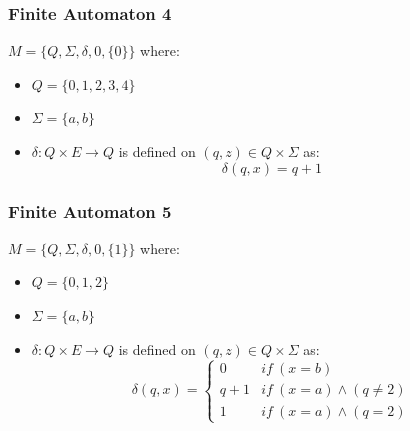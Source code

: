 \documentclass[letterpaper, 12pt]{math}
\begin{document}
\subsubsection*{Finite Automaton 4}
\( M = \{Q,\Sigma,\delta,0,\{0\}\} \) where:
\begin{itemize}
  \item \( Q = \{0,1,2,3,4\} \)
  \item \( \Sigma = \{a,b\} \)
  \item \( \delta: Q\times E\to Q \) is defined on \( (q,z)\in Q\times\Sigma \) as:
    \[ \delta(q,x) = q+1 \]
\end{itemize}

\subsubsection*{Finite Automaton 5}
\( M = \{Q,\Sigma,\delta,0,\{1\}\} \) where:
\begin{itemize}
  \item \( Q = \{0,1,2\} \)
  \item \( \Sigma = \{a,b\} \)
  \item \( \delta: Q\times E\to Q \) is defined on \( (q,z)\in Q\times\Sigma \) as:
    \[ \delta(q,x) = \begin{cases}
      0 & if\ (x = b) \\
      q+1 & if\ (x = a) \wedge (q \ne 2) \\
      1 & if\ (x = a) \wedge (q = 2)
    \end{cases} \]
\end{itemize}
\end{document}
